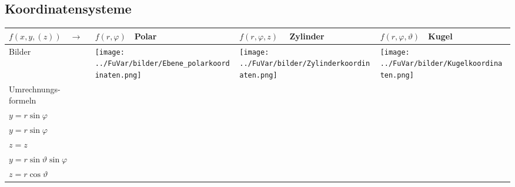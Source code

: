 \subsection{Koordinatensysteme}
\begin{tabular}{|p{2.5cm}||p{3cm}|p{4.2cm}|p{7.5cm}|}
	\hline
	$f(x,y,(z))\quad\rightarrow$ &
	\begin{minipage}{2.4cm}
    	\vspace{0.1cm}
		$f(r,\varphi)\quad$\textbf{Polar} 
    	\vspace{0.1cm}    	
    \end{minipage}& 
	$f(r,\varphi,z)\quad$ \textbf{Zylinder} &
	$f(r,\varphi,\vartheta)\quad$\textbf{Kugel}\\
	\hline
	\hline
	Bilder &
	\begin{minipage}{3cm}
    	\texttt{[image: ../FuVar/bilder/Ebene\_polarkoordinaten.png]}
    \end{minipage}&
	\begin{minipage}{3cm}
    	\texttt{[image: ../FuVar/bilder/Zylinderkoordinaten.png]}
    \end{minipage}&
	\begin{minipage}{3cm}
    	\texttt{[image: ../FuVar/bilder/Kugelkoordinaten.png]}
    \end{minipage}\\
	\hline
	Umrechnungs- formeln &
	\begin{minipage}{3cm}
    \vspace{0.1cm}
		$x=r\cos\varphi$\\
		$y=r\sin\varphi$    
    \vspace{0.1cm}
    \end{minipage}&	
	\begin{minipage}{4.2cm}
    \vspace{0.1cm}
    	$x=r\cos\varphi$\\
    	$y=r\sin\varphi$\\
    	$z=z$
    \vspace{0.1cm}
    \end{minipage}&	
	\begin{minipage}{7.5cm}
    \vspace{0.1cm}
    	$x=r\sin\vartheta\cos\varphi$\\
    	$y=r\sin\vartheta\sin\varphi$\\
    	$z=r\cos\vartheta$
    \vspace{0.1cm}
    \end{minipage}\\

\end{tabular}
